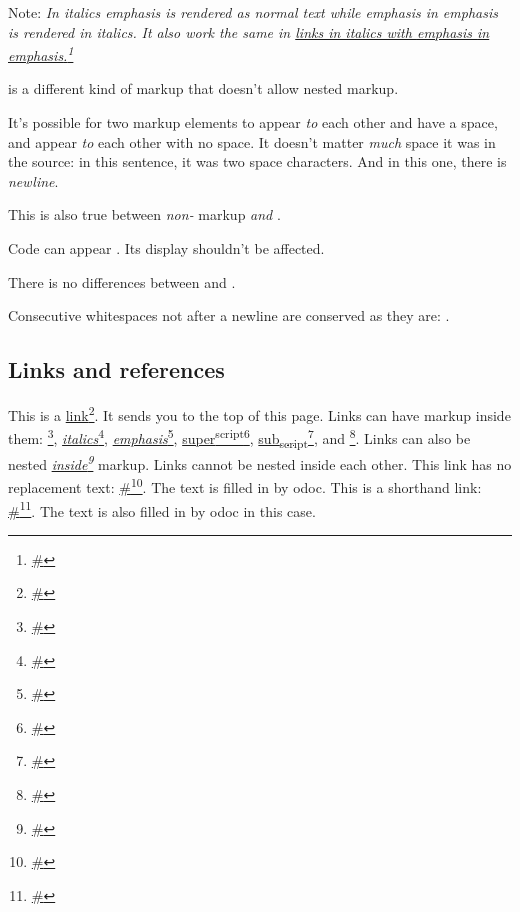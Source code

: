 Note: \emph{In italics \emph{emphasis} is rendered as normal text while \emph{emphasis \emph{in} emphasis} is rendered in italics.} \emph{It also work the same in \href{\#}{links in italics with \emph{emphasis \emph{in} emphasis}.}\footnote{\url{\#}}}

 is a different kind of markup that doesn't allow nested markup.

It's possible for two markup elements to appear  \emph{to} each other and have a space, and appear \emph{to} each other with no space. It doesn't matter  \emph{much} space it was in the source: in this sentence, it was two space characters. And in this one, there is  \emph{newline}.

This is also true between \emph{non-} markup \emph{and} .

Code can appear . Its display shouldn't be affected.

There is no differences between  and .

Consecutive whitespaces not after a newline are conserved as they are: .

\subsection{Links and references\label{Markup--links-and-references}}%
This is a \href{\#}{link}\footnote{\url{\#}}. It sends you to the top of this page. Links can have markup inside them: \href{\#}{}\footnote{\url{\#}}, \href{\#}{\emph{italics}}\footnote{\url{\#}}, \href{\#}{\emph{emphasis}}\footnote{\url{\#}}, \href{\#}{super\textsuperscript{script}}\footnote{\url{\#}}, \href{\#}{sub\textsubscript{script}}\footnote{\url{\#}}, and \href{\#}{}\footnote{\url{\#}}. Links can also be nested \emph{\href{\#}{inside}\footnote{\url{\#}}} markup. Links cannot be nested inside each other. This link has no replacement text: \href{\#}{\#}\footnote{\url{\#}}. The text is filled in by odoc. This is a shorthand link: \href{\#}{\#}\footnote{\url{\#}}. The text is also filled in by odoc in this case.

